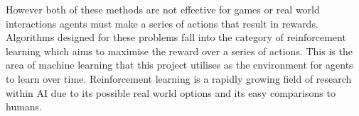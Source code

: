 However both of these methods are not effective for games or real world interactions agents must make a series of
actions that result in rewards. Algorithms designed for these problems fall into the category of reinforcement learning
which aims to maximise the reward over a series of actions. This is the area of machine learning that this project
utilises as the environment for agents to learn over time.
Reinforcement learning is a rapidly growing field of research within AI due to its possible real world options and
its easy comparisons to humans.


